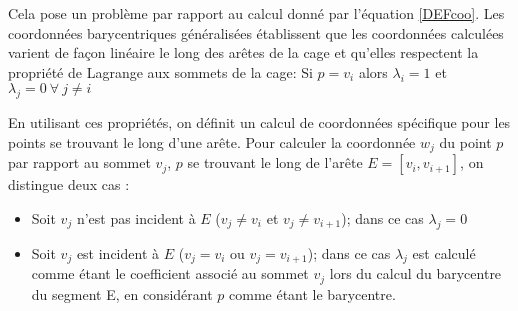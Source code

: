 Cela pose un problème par rapport au calcul donné par l'équation \ref{DEFcoo}.
Les coordonnées barycentriques généralisées établissent que les coordonnées
calculées varient de façon linéaire le long des arêtes de la cage et qu'elles
respectent la propriété de Lagrange aux sommets de la cage: Si $p = v_i$ alors
$\lambda_i = 1$ et $\lambda_j = 0 ~\forall~ j \neq i$

En utilisant ces propriétés, on définit un calcul de coordonnées spécifique
pour les points se trouvant le long d'une arête. Pour calculer la coordonnée
$w_j$ du point $p$ par rapport au sommet $v_j$, $p$ se trouvant le long de
l'arête $E = [v_i,v_{i+1}]$, on distingue deux cas :

\begin{itemize}

\item Soit $v_j$ n'est pas incident à $E$ ($v_j \neq v_i$ et $v_j \neq
v_{i+1}$); dans ce cas $\lambda_j = 0$

\item Soit $v_j$ est incident à $E$ ($v_j = v_i$ ou $v_j = v_{i+1}$); dans ce
cas $\lambda_j$ est calculé comme étant le coefficient associé au sommet $v_j$
lors du calcul du barycentre du segment E, en considérant $p$ comme étant le
barycentre.

\end{itemize}